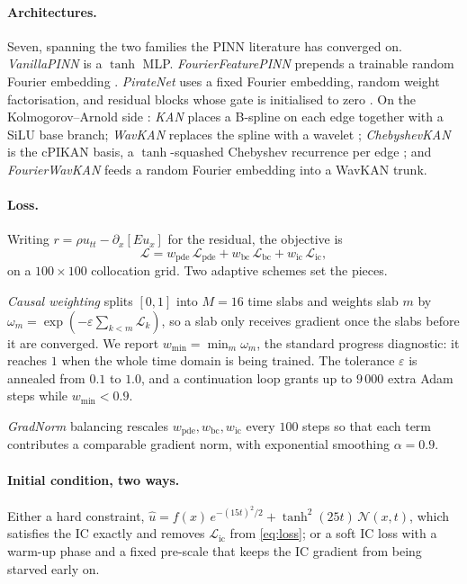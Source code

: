 \paragraph{Architectures.} Seven, spanning the two families the PINN
literature has converged on. \emph{VanillaPINN} is a $\tanh$ MLP.
\emph{FourierFeaturePINN} prepends a trainable random Fourier embedding
\citep{tancik2020fourier,wang2021fourier}. \emph{PirateNet} uses a fixed
Fourier embedding, random weight factorisation, and residual blocks whose gate
is initialised to zero \citep{wang2024piratenet}. On the
Kolmogorov--Arnold side \citep{liu2024kan}: \emph{KAN} places a B-spline on
each edge together with a SiLU base branch; \emph{WavKAN} replaces the spline
with a wavelet \citep{bozorgasl2024wavkan}; \emph{ChebyshevKAN} is the cPIKAN
basis, a $\tanh$-squashed Chebyshev recurrence per edge
\citep{shukla2024pikan}; and \emph{FourierWavKAN} feeds a random Fourier
embedding into a WavKAN trunk.

\paragraph{Loss.} Writing $r = \rho u_{tt} - \partial_x[E u_x]$ for the
residual, the objective is
\begin{equation}
\mathcal{L} = w_{\mathrm{pde}}\,\mathcal{L}_{\mathrm{pde}}
            + w_{\mathrm{bc}}\,\mathcal{L}_{\mathrm{bc}}
            + w_{\mathrm{ic}}\,\mathcal{L}_{\mathrm{ic}},
\label{eq:loss}
\end{equation}
on a $100\times100$ collocation grid. Two adaptive schemes set the pieces.

\emph{Causal weighting} \citep{wang2022causal} splits $[0,1]$ into
$M = 16$ time slabs and weights slab $m$ by
$\omega_m = \exp(-\varepsilon \sum_{k<m} \mathcal{L}_k)$, so a slab only
receives gradient once the slabs before it are converged. We report
$w_{\min} = \min_m \omega_m$, the standard progress diagnostic: it reaches $1$
when the whole time domain is being trained. The tolerance $\varepsilon$ is
annealed from $0.1$ to $1.0$, and a continuation loop grants up to $9\,000$
extra Adam steps while $w_{\min} < 0.9$.

\emph{GradNorm} balancing \citep{wang2021gradientflow,wang2023expert} rescales
$w_{\mathrm{pde}}, w_{\mathrm{bc}}, w_{\mathrm{ic}}$ every $100$ steps so that
each term contributes a comparable gradient norm, with exponential smoothing
$\alpha = 0.9$.

\paragraph{Initial condition, two ways.} Either a hard constraint,
$\hat u = f(x)\,e^{-(15t)^2/2} + \tanh^2(25t)\,\mathcal{N}(x,t)$, which
satisfies the IC exactly and removes $\mathcal{L}_{\mathrm{ic}}$ from
\eqref{eq:loss}; or a soft IC loss with a warm-up phase and a fixed pre-scale
that keeps the IC gradient from being starved early on.

